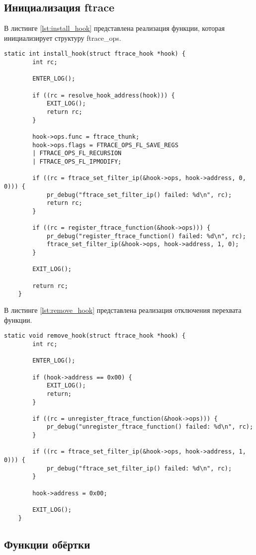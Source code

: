 \subsection{Инициализация ftrace}

В листинге \ref{lst:install_hook} представлена реализация функции, которая инициализирует структуру ftrace\_ops.

\begin{lstlisting}[label=lst:install_hook, caption=Реализация функции install\_hook()]
	static int install_hook(struct ftrace_hook *hook) {
		int rc;
		
		ENTER_LOG();
		
		if ((rc = resolve_hook_address(hook))) {
			EXIT_LOG();
			return rc;
		}
		
		hook->ops.func = ftrace_thunk; 
		hook->ops.flags = FTRACE_OPS_FL_SAVE_REGS
		| FTRACE_OPS_FL_RECURSION
		| FTRACE_OPS_FL_IPMODIFY;
		
		if ((rc = ftrace_set_filter_ip(&hook->ops, hook->address, 0, 0))) {
			pr_debug("ftrace_set_filter_ip() failed: %d\n", rc);
			return rc;
		}
		
		if ((rc = register_ftrace_function(&hook->ops))) {
			pr_debug("register_ftrace_function() failed: %d\n", rc);
			ftrace_set_filter_ip(&hook->ops, hook->address, 1, 0);
		}
		
		EXIT_LOG();
		
		return rc;
	}
\end{lstlisting}

В листинге \ref{lst:remove_hook} представлена реализация отключения перехвата функции.

\begin{lstlisting}[label=lst:remove_hook, caption=Реализация функции remove\_hook()]
	static void remove_hook(struct ftrace_hook *hook) {
		int rc;
		
		ENTER_LOG();
		
		if (hook->address == 0x00) {
			EXIT_LOG();
			return;
		}
		
		if ((rc = unregister_ftrace_function(&hook->ops))) {
			pr_debug("unregister_ftrace_function() failed: %d\n", rc);
		}
		
		if ((rc = ftrace_set_filter_ip(&hook->ops, hook->address, 1, 0))) {
			pr_debug("ftrace_set_filter_ip() failed: %d\n", rc);
		}
		
		hook->address = 0x00;
		
		EXIT_LOG();
	}
\end{lstlisting}

\subsection{Функции обёртки}

